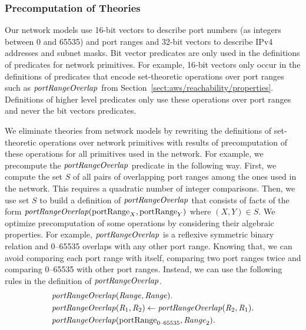 
\subsubsection*{Precomputation of Theories}
Our network models use 16-bit vectors to describe port numbers (as integers between 0 and 65535) and port ranges and 32-bit vectors to describe IPv4 addresses and subnet masks. Bit vector predicates are only used in the definitions of predicates for network primitives. For example, 16-bit vectors only occur in the definitions of predicates that encode set-theoretic operations over port ranges such as $\mathit{portRangeOverlap}$ from Section~\ref{sect:aws/reachability/properties}. Definitions of higher level predicates only use these operations over port ranges and never the bit vectors predicates.

We eliminate theories from network models by rewriting the definitions of set-theoretic operations over network primitives with results of precomputation of these operations for all primitives used in the network. For example, we precompute the $\mathit{portRangeOverlap}$ predicate in the following way. First, we compute the set $S$ of all pairs of overlapping port ranges among the ones used in the network. This requires a quadratic number of integer comparisons. Then, we use set $S$ to build a definition of $\mathit{portRangeOverlap}$ that consists of facts of the form $\mathit{portRangeOverlap}(\mathrm{portRange}_X,\mathrm{portRange}_Y)$ where $(X,Y)\in S$. We optimize precomputation of some operations by considering their algebraic properties. For example, $\mathit{portRangeOverlap}$ is a reflexive symmetric binary relation and 0--65535 overlaps with any other port range. Knowing that, we can avoid comparing each port range with itself, comparing two port ranges twice and comparing 0--65535 with other port ranges. Instead, we can use the following rules in the definition of $\mathit{portRangeOverlap}$.
\begin{equation}\label{eq:aws/port-range-algebraic}
\begin{aligned}
&\mathit{portRangeOverlap}(\mathit{Range},\mathit{Range}).\\
&\mathit{portRangeOverlap}(\mathit{R}_1,\mathit{R}_2)\leftarrow\mathit{portRangeOverlap}(\mathit{R}_2,\mathit{R}_1).\\
&\mathit{portRangeOverlap}(\mathrm{portRange}_\text{0--65535},\mathit{Range}_2).
\end{aligned}
\end{equation}

